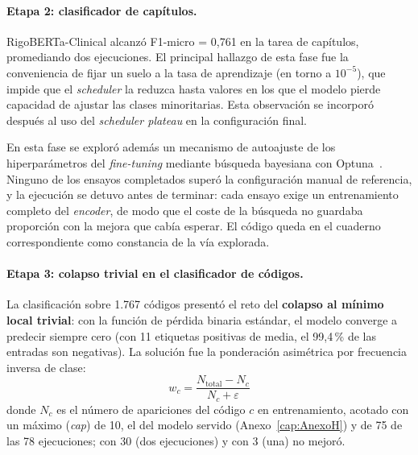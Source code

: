 \paragraph{Etapa 2: clasificador de capítulos.}
RigoBERTa-Clinical alcanzó F1-micro = 0,761 en la tarea de capítulos, promediando dos ejecuciones. El principal hallazgo de esta fase fue la conveniencia de fijar un suelo a la tasa de aprendizaje (en torno a $10^{-5}$), que impide que el \emph{scheduler} la reduzca hasta valores en los que el modelo pierde capacidad de ajustar las clases minoritarias. Esta observación se incorporó después al uso del \emph{scheduler plateau} en la configuración final.

En esta fase se exploró además un mecanismo de autoajuste de los hiperparámetros del \emph{fine-tuning} mediante búsqueda bayesiana con Optuna~\cite{akiba2019optuna}. Ninguno de los ensayos completados superó la configuración manual de referencia, y la ejecución se detuvo antes de terminar: cada ensayo exige un entrenamiento completo del \emph{encoder}, de modo que el coste de la búsqueda no guardaba proporción con la mejora que cabía esperar. El código queda en el cuaderno correspondiente como constancia de la vía explorada.

\paragraph{Etapa 3: colapso trivial en el clasificador de códigos.}
La clasificación sobre 1.767 códigos presentó el reto del \textbf{colapso al mínimo local trivial}: con la función de pérdida binaria estándar, el modelo converge a predecir siempre cero (con 11 etiquetas positivas de media, el 99,4\,\% de las entradas son negativas). La solución fue la ponderación asimétrica por frecuencia inversa de clase:
\begin{equation}
w_c = \frac{N_{\text{total}} - N_c}{N_c + \varepsilon}
\end{equation}
donde $N_c$ es el número de apariciones del código $c$ en entrenamiento, acotado con un máximo (\emph{cap}) de 10, el del modelo servido (Anexo~\ref{cap:AnexoH}) y de 75 de las 78 ejecuciones; con 30 (dos ejecuciones) y con 3 (una) no mejoró.

